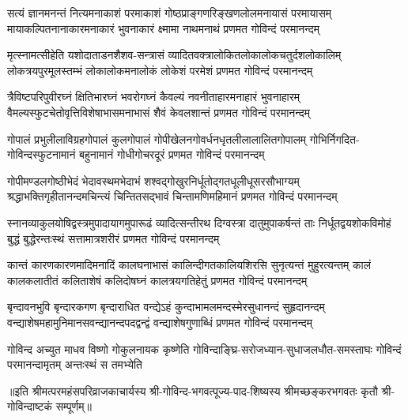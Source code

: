 
\fourlineindentedshloka
{सत्यं ज्ञानमनन्तं नित्यमनाकाशं परमाकाशं}
{गोष्ठप्राङ्गणरिङ्खणलोलमनायासं परमायासम्}
{मायाकल्पितनानाकारमनाकारं भुवनाकारं}
{क्ष्मामा नाथमनाथं प्रणमत गोविन्दं परमानन्दम्}

\fourlineindentedshloka
{मृत्स्नामत्सीहेति यशोदाताडनशैशव-सन्त्रासं}
{व्यादितवक्त्रालोकितलोकालोकचतुर्दशलोकालिम्}
{लोकत्रयपुरमूलस्तम्भं लोकालोकमनालोकं}
{लोकेशं परमेशं प्रणमत गोविन्दं परमानन्दम्}

\fourlineindentedshloka
{त्रैविष्टपरिपुवीरघ्नं क्षितिभारघ्नं भवरोगघ्नं}
{कैवल्यं नवनीताहारमनाहारं भुवनाहारम्}
{वैमल्यस्फुटचेतोवृत्तिविशेषाभासमनाभासं}
{शैवं केवलशान्तं प्रणमत गोविन्दं परमानन्दम्}

\fourlineindentedshloka
{गोपालं प्रभुलीलाविग्रहगोपालं कुलगोपालं}
{गोपीखेलनगोवर्धनधृतलीलालालितगोपालम्}
{गोभिर्निगदित-गोविन्दस्फुटनामानं बहुनामानं}
{गोधीगोचरदूरं प्रणमत गोविन्दं परमानन्दम्}

\fourlineindentedshloka
{गोपीमण्डलगोष्ठीभेदं भेदावस्थमभेदाभं}
{शश्वद्गोखुरनिर्धूतोद्गतधूलीधूसरसौभाग्यम्}
{श्रद्धाभक्तिगृहीतानन्दमचिन्त्यं चिन्तितसद्भावं}
{चिन्तामणिमहिमानं प्रणमत गोविन्दं परमानन्दम्}

\fourlineindentedshloka
{स्नानव्याकुलयोषिद्वस्त्रमुपादायागमुपारूढं}
{व्यादित्सन्तीरथ दिग्वस्त्रा दातुमुपाकर्षन्तं ताः}
{निर्धूतद्वयशोकविमोहं बुद्धं बुद्धेरन्तःस्थं}
{सत्तामात्रशरीरं प्रणमत गोविन्दं परमानन्दम्}

\fourlineindentedshloka
{कान्तं कारणकारणमादिमनादिं कालघनाभासं}
{कालिन्दीगतकालियशिरसि सुनृत्यन्तं मुहुरत्यन्तम्}
{कालं कालकलातीतं कलिताशेषं कलिदोषघ्नं}
{कालत्रयगतिहेतुं प्रणमत गोविन्दं परमानन्दम्}

\fourlineindentedshloka
{बृन्दावनभुवि बृन्दारकगण बृन्दाराधित वन्द्येऽहं}
{कुन्दाभामलमन्दस्मेरसुधानन्दं सुहृदानन्दम्}
{वन्द्याशेषमहामुनिमानसवन्द्यानन्दपदद्वन्द्वं}
{वन्द्याशेषगुणाब्धिं प्रणमत गोविन्दं परमानन्दम्}

{गोविन्द अच्युत माधव विष्णो गोकुलनायक कृष्णेति}
{गोविन्दाङ्घ्रि-सरोजध्यान-सुधाजलधौत-समस्ताघः}
{गोविन्दं परमानन्दामृतम् अन्तःस्थं स तमभ्येति}

॥इति श्रीमत्परमहंसपरिव्राजकाचार्यस्य श्री-गोविन्द-भगवत्पूज्य-पाद-शिष्यस्य
श्रीमच्छङ्करभगवतः कृतौ श्री-गोविन्दाष्टकं सम्पूर्णम्॥